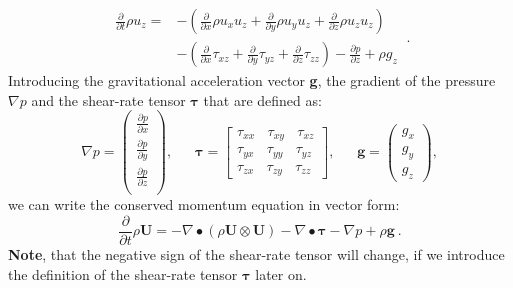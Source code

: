 \documentclass[MathematicsNumericsDerivationsAndOpenFOAM.tex]{subfiles}
\begin{document}
\begin{equation}
\boxed{
\begin{aligned}
  \frac{\partial}{\partial t} \rho u_z
=
 &-\left(
      \frac{\partial}{\partial x} \rho u_x u_z
      +\frac{\partial}{\partial y} \rho u_y u_z
      +\frac{\partial}{\partial z} \rho u_z u_z
  \right)\\
 &-\left(
      \frac{\partial}{\partial x}  \tau_{xz}
      +\frac{\partial}{\partial y}  \tau_{yz}
      +\frac{\partial}{\partial z}  \tau_{zz}
  \right)
  -
  \frac{\partial p}{\partial z}
  +
  \rho g_z
  \label{EQUATION::momentumZ}
\end{aligned}
}~.
\end{equation}
%
%
	Introducing the gravitational acceleration vector \textbf{g}, the gradient
    of the pressure $  \nabla p$ and the shear-rate tensor $\boldsymbol \tau$
    that are defined as:
%
%
\begin{equation*}
    \nabla p
=
\left(
  \begin{matrix}
    \frac{\partial p}{\partial x} \\
    \frac{\partial p}{\partial y} \\
    \frac{\partial p}{\partial z} \\
  \end{matrix}
  \right),
  ~ ~ ~ ~ ~ ~ ~
\boldsymbol \tau
=
\left[
 \begin{matrix}
  \tau_{xx} ~~~~ \tau_{xy} ~~~~ \tau_{xz} \\
  \tau_{yx} ~~~~ \tau_{yy} ~~~~ \tau_{yz} \\
  \tau_{zx} ~~~~ \tau_{zy} ~~~~ \tau_{zz}
 \end{matrix}
\right],
  ~ ~ ~ ~ ~ ~ ~
\textbf{g}
=
\left(
 \begin{matrix}
  g_x \\
  g_y \\
  g_z
 \end{matrix}
\right),
\end{equation*}
%
%
	we can write the conserved momentum equation in vector form:
%
%
\begin{equation}
 \boxed{
    \frac{\partial}{\partial t} \rho \textbf{U}
=
    -   \nabla \bullet \left(\rho\textbf{U} \otimes \textbf{U}\right)
    -   \nabla \bullet \boldsymbol \tau
    -   \nabla p
    + \rho\textbf{g}
 }~.
 \label{EQUATION::momentumDiv}
\end{equation}
%
%
    \textbf{Note}, that the negative sign of the shear-rate tensor will change,
    if we introduce the definition of the shear-rate tensor $\boldsymbol \tau$
    later on.
%
%
%
%
%
\end{document}
